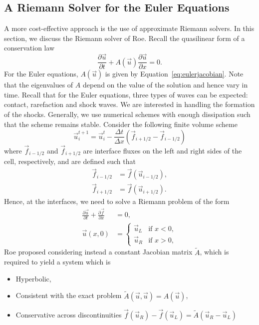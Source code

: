 \subsection{A Riemann Solver for the Euler Equations}
A more cost-effective approach is the use of approximate Riemann solvers. In this section, we discuss the Riemann solver of Roe. Recall the quasilinear form of a conservation law
\begin{equation}
	\frac{\partial \vec u}{\partial t} + A(\vec u) \frac{\partial \vec u}{\partial x} = 0.
\end{equation}
For the Euler equations, $A(\vec u)$ is given by Equation~\ref{eq:eulerjacobian}. Note that the eigenvalues of $A$ depend on the value of the solution and hence vary in time. Recall that for the Euler equations, three types of waves can be expected: contact, rarefaction and shock waves. We are interested in handling the formation of the shocks. 
Generally, we use numerical schemes with enough dissipation such that the scheme remains stable. Consider the following finite volume scheme
\begin{equation}
	\vec u^{t+1}_i = \vec u^t_i - \frac{\Delta t}{\Delta x} \left(\vec f_{i+1/2} - \vec f_{i-1/2}\right) 
\end{equation}
where $\vec f_{i-1/2}$ and $\vec f_{i+1/2}$ are interface fluxes on the left and right sides of the cell, respectively, and are defined such that
\begin{align}
	\vec f_{i-1/2} &= \vec f (\vec u_{i-1/2}), \\
	\vec f_{i+1/2} &= \vec f (\vec u_{i+1/2}).
\end{align}
Hence, at the interfaces, we need to solve a Riemann problem of the form
\begin{align}
	\frac{\partial \vec u}{\partial t} + \frac{\partial \vec f}{\partial x} &= 0,\\
	\vec u(x, 0) &=
	\begin{cases}
		\vec u_L & \text{if } x<0,\\
		\vec u_R & \text{if } x>0,
	\end{cases}
\end{align}
Roe proposed considering instead a constant Jacobian matrix $\tilde A$, which is required to yield a system which is
\begin{itemize}
	\item Hyperbolic,
	\item Consistent with the exact problem $\tilde A (\vec u, \vec u) = A(\vec u)$,
	\item Conservative across discontinuities $\vec f(\vec u_R) - \vec f (\vec u_L) = \tilde A(\vec u_R - \vec u_L) $
\end{itemize}
